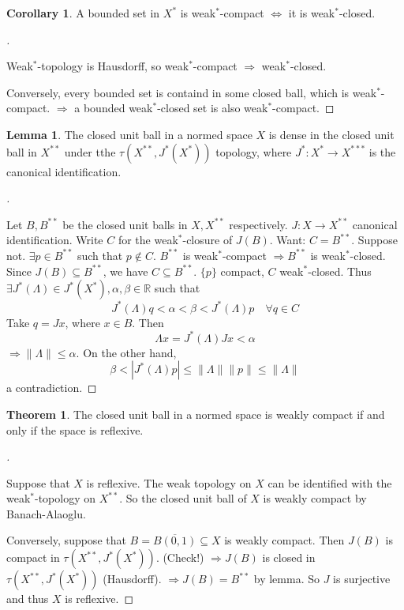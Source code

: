 \documentclass{article}
\theoremstyle{definition}
\newtheorem{thm}{Theorem}
\newtheorem{lem}{Lemma}
\newtheorem{cor}{Corollary}
\newenvironment{proofs}[1][\proofname]{%
  \begin{proof}[#1]$ $\par\nobreak\ignorespaces
}{%
  \end{proof}
}
\newcommand{\RR}{\mathbb R}
\newcommand{\Ra}{\Rightarrow}
\newcommand{\Lra}{\Leftrightarrow}
\begin{document}
\begin{cor}
	A bounded set in $X^*$ is weak$^*$-compact $\Lra$ it is weak$^*$-closed.
\end{cor}

\begin{proofs}
	Weak$^*$-topology is Hausdorff, so weak$^*$-compact $\Ra$ weak$^*$-closed.

	\par Conversely, every bounded set is containd in some closed ball, which is weak$^*$-compact.
	$\Ra$ a bounded weak$^*$-closed set is also weak$^*$-compact.
\end{proofs}

\begin{lem}
	The closed unit ball in a normed space $X$ is dense in the closed unit ball in $X^{**}$ under tthe $\tau(X^{**}, J^*(X^*))$ topology, where $J^*: X^* \to X^{***}$ is the canonical identification.
\end{lem}

\begin{proofs}
	Let $B, B^{**}$ be the closed unit balls in $X, X^{**}$ respectively.
	$J: X \to X^{**}$ canonical identification.
	Write $C$ for the weak$^*$-closure of $J(B)$.
	Want: $C = B^{**}$.
	Suppose not.
	$\exists p \in B^{**}$ such that $p \notin C$.
	$B^{**}$ is weak$^*$-compact $\Ra B^{**}$ is weak$^*$-closed.
	Since $J(B) \subseteq B^{**}$, we have $C \subseteq B^{**}$.
	$\{p\}$ compact, $C$ weak$^*$-closed.
	Thus $\exists J^*(\Lambda) \in J^*(X^*), \alpha, \beta \in \RR$ such that
	\[
		J^*(\Lambda) q < \alpha < \beta < J^*(\Lambda) p \quad \forall q \in C
	\]
	Take $q = Jx$, where $x \in B$.
	Then
	\[
		\Lambda x = J^*(\Lambda) J x < \alpha
	\]
	$\Ra \|\Lambda\| \leq \alpha$.
	On the other hand, 
	\[
		\beta < |J^*(\Lambda) p| \leq \|\Lambda\| \|p\| \leq \|\Lambda\|
	\]
	a contradiction.
\end{proofs}

\begin{thm}
	The closed unit ball in a normed space is weakly compact if and only if the space is reflexive.
\end{thm}

\begin{proofs}
	Suppose that $X$ is reflexive.
	The weak topology on $X$ can be identified with the weak$^*$-topology on $X^{**}$.
	So the closed unit ball of $X$ is weakly compact by Banach-Alaoglu.
	
	\par Conversely, suppose that $B = \overline{B(0, 1)} \subseteq X$ is weakly compact.
	Then $J(B)$ is compact in $\tau(X^{**}, J^*(X^*))$. (Check!)
	$\Ra J(B)$ is closed in $\tau(X^{**}, J^*(X^*))$ (Hausdorff).
	$\Ra J(B) = B^{**}$ by lemma.
	So $J$ is surjective and thus $X$ is reflexive.
\end{proofs}
\end{document}
